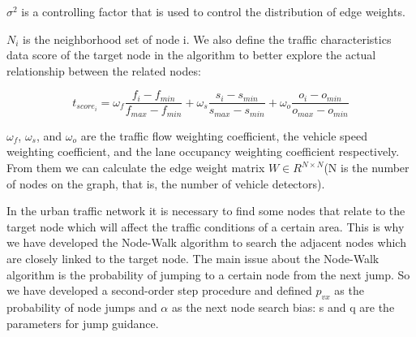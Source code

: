 \documentclass[conference]{IEEEtran}
\begin{document}
\par
$\sigma ^2$ is a controlling factor that is used to control the distribution of edge weights.
\par
$N_i$ is the neighborhood set of node i. We also define the traffic characteristics data score of the target node in the algorithm to better explore the actual relationship between the related nodes:

\begin{equation}
    t_{{score}_i}=\omega _f \frac{f_i - f_{min}}{f_{max} - f_{min}} + \omega_s \frac{s_i - s_{min}}{s_{max} - s_{min}} + \omega_o \frac{o_i - o_{min}}{o_{max} - o_{min}}
\end{equation}  

\par
$\omega _f$, $\omega _s$, and $\omega_o$ are the traffic flow weighting coefficient, the vehicle speed weighting coefficient, and the lane occupancy weighting coefficient respectively. From them we can calculate the edge weight matrix $ W\in R^{N\times N} $(N is the number of nodes on the graph, that is, the number of vehicle detectors).
\par
In the urban traffic network it is necessary to find some nodes that relate to the target node which will affect the traffic conditions of a certain area. This is why we have developed the Node-Walk algorithm to search the adjacent nodes which are closely linked to the target node. The main issue about the Node-Walk algorithm is the probability of jumping to a certain node from the next jump. So we have developed a second-order step procedure and defined $p_{vx}$ as the probability of node jumps and $\alpha$  as the next node search bias: s and q are the parameters for jump guidance.



\end{document}
